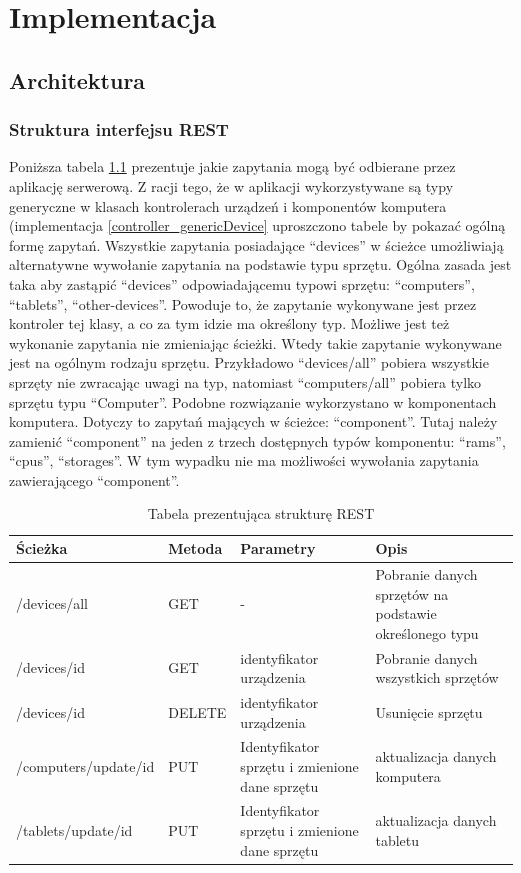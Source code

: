 \chapter{Implementacja}

\section{Architektura}


\subsection{Struktura interfejsu REST}
Poniższa tabela \ref{tab:rest} prezentuje jakie zapytania mogą być odbierane przez aplikację serwerową. Z racji tego, że w aplikacji wykorzystywane są typy generyczne w klasach kontrolerach urządzeń i komponentów komputera (implementacja \ref{controller_genericDevice} uproszczono tabele by pokazać ogólną formę zapytań. Wszystkie zapytania posiadające "`devices"' w ścieżce umożliwiają alternatywne wywołanie zapytania na podstawie typu sprzętu. Ogólna zasada jest taka aby zastąpić "`devices"' odpowiadającemu typowi sprzętu: "`computers"', "`tablets"', "`other-devices"'. Powoduje to, że zapytanie wykonywane jest przez kontroler tej klasy, a co za tym idzie ma określony typ. Możliwe jest też wykonanie zapytania nie zmieniając ścieżki. Wtedy takie zapytanie wykonywane jest na ogólnym rodzaju sprzętu. Przykładowo "`devices/all"' pobiera wszystkie sprzęty nie zwracając uwagi na typ, natomiast "`computers/all"' pobiera tylko sprzętu typu "`Computer"'. Podobne rozwiązanie wykorzystano w komponentach komputera. Dotyczy to zapytań mających w ścieżce: "`component"'. Tutaj należy zamienić "`component"' na jeden z trzech dostępnych typów komponentu: "`rams"', "`cpus"', "`storages"'. W tym wypadku nie ma możliwości wywołania zapytania zawierającego "`component"'.

\begin{table}[H]
	\centering
\caption{Tabela prezentująca strukturę REST }
\label{tab:rest}
\begin{tabularx}{\linewidth}{|X|X|X|X|}
    \hline
    Ścieżka & Metoda & Parametry & Opis  \\
    \hline \hline
		/devices/all 	& GET & - & Pobranie danych sprzętów na podstawie określonego typu \\
		\hline
		/devices/{id} & GET & identyfikator urządzenia 	& Pobranie danych wszystkich sprzętów\\
    \hline
		/devices/{id}	& DELETE & identyfikator urządzenia 	& Usunięcie sprzętu\\
    \hline
		 /computers/update/id & PUT & Identyfikator sprzętu i zmienione dane sprzętu& aktualizacja danych komputera\\
		\hline
		 /tablets/update/id & PUT & Identyfikator sprzętu i zmienione dane sprzętu& aktualizacja danych tabletu\\
		\hline
		 
		\end{tabularx}
		\end{table}

